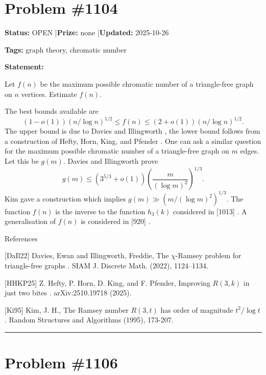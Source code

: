 \documentclass{article}
\begin{document}
\section{Problem \#1104}
\label{prob:1104}

\noindent\textbf{Status:} OPEN \quad|\quad \textbf{Prize:} none \quad|\quad \textbf{Updated:} 2025-10-26

\noindent\textbf{Tags:} graph theory, chromatic number

\medskip

\noindent\textbf{Statement:}

Let $f(n)$ be the maximum possible chromatic number of a triangle-free graph on $n$ vertices. Estimate $f(n)$.




The best bounds available are\[(1-o(1))(n/\log n)^{1/2}\leq f(n) \leq (2+o(1))(n/\log n)^{1/2}.\]The upper bound is due to Davies and Illingworth \cite{DaIl22}, the lower bound follows from a construction of Hefty, Horn, King, and Pfender \cite{HHKP25}. One can ask a similar question for the maximum possible chromatic number of a triangle-free graph on $m$ edges. Let this be $g(m)$. Davies and Illingworth \cite{DaIl22} prove\[g(m) \leq (3^{5/3}+o(1))\left(\frac{m}{(\log m)^2}\right)^{1/3}.\]Kim \cite{Ki95} gave a construction which implies $g(m) \gg (m/(\log m)^2)^{1/3}$. The function $f(n)$ is the inverse to the function $h_3(k)$ considered in [1013] . A generalisation of $f(n)$ is considered in [920] .




References

[DaIl22] Davies, Ewan and Illingworth, Freddie, The {$\chi$}-{R}amsey problem for triangle-free graphs . SIAM J. Discrete Math. (2022), 1124--1134.

[HHKP25] Z. Hefty, P. Horn, D. King, and F. Pfender, Improving $R(3,k)$ in just two bites . arXiv:2510.19718 (2025).

[Ki95] Kim, J. H., The Ramsey number $R(3,t)$ has order of magnitude $t^2/\log t$ . Random Structures and Algorithms (1995), 173-207.

\noindent\rule{\linewidth}{0.4pt}


\section{Problem \#1106}
\label{prob:1106}
\end{document}

